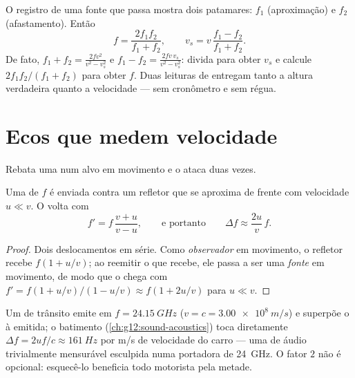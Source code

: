 \begin{method}\label{met:g12:doppler-effect:pass}
O registro de uma fonte que passa mostra dois patamares: $f_1$
(aproximação) e $f_2$ (afastamento). Então
\[
f = \frac{2 f_1 f_2}{f_1 + f_2}, \qquad
v_s = v\,\frac{f_1 - f_2}{f_1 + f_2}.
\]
De fato, $f_1 + f_2 = \frac{2fv^2}{v^2 - v_s^2}$ e
$f_1 - f_2 = \frac{2fv\,v_s}{v^2 - v_s^2}$: divida para obter $v_s$ e
calcule $2f_1 f_2/(f_1 + f_2)$ para obter $f$. Duas leituras de
 entregam tanto a altura verdadeira quanto a velocidade ---
sem cronômetro e sem régua.
\end{method}

\section{Ecos que medem velocidade}

Rebata uma  num alvo em movimento e o  ataca duas
vezes.

\begin{proposition}\label{prop:g12:doppler-effect:double}
Uma  de  $f$ é enviada contra um refletor que se aproxima
de frente com velocidade $u \ll v$. O  volta com
\[ f' = f\,\frac{v + u}{v - u}, \qquad \text{e portanto} \qquad \Delta f \approx \frac{2u}{v}\,f . \]
\end{proposition}

\begin{proof}
Dois deslocamentos em série. Como \emph{observador} em movimento, o
refletor recebe $f(1 + u/v)$; ao reemitir o que recebe, ele passa a ser
uma \emph{fonte} em movimento, de modo que o  chega com
$f' = f(1 + u/v)/(1 - u/v) \approx f(1 + 2u/v)$ para $u \ll v$.
\end{proof}

\begin{example}\label{ex:g12:doppler-effect:radar}
Um  de trânsito emite  em $f = \qty{24.15}{GHz}$
($v = c = \qty{3.00e8}{m/s}$) e superpõe o  à  emitida; o
batimento (\cref{ch:g12:sound-acoustics}) toca diretamente
$\Delta f = 2uf/c \approx \qty{161}{Hz}$ por \unit{m/s} de velocidade do
carro --- uma  de áudio trivialmente mensurável esculpida numa
portadora de \qty{24}{GHz}. O fator $2$ não é opcional: esquecê-lo
beneficia todo motorista pela metade.
\end{example}


